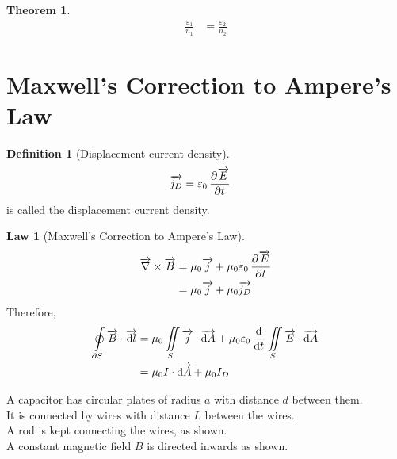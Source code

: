 \documentclass[fleqn, a4paper, 8pt, twoside]{amsart}
\theoremstyle{definition}
\newtheorem{definition}{Definition}
\theoremstyle{theorem}
\newtheorem{theorem}{Theorem}
\newtheorem{law}{Law}
\begin{document}
\begin{multicols}{2}
\begin{spacing}{0.6}
\begin{theorem}
	\begin{align*}
		\frac{\varepsilon_1}{n_1} & = \frac{\varepsilon_2}{n_2}
	\end{align*}
\end{theorem}

\section{Maxwell's Correction to Ampere's Law}

\begin{definition}[Displacement current density]
	\begin{align*}
		\overrightarrow{j_D} & = \varepsilon_0 \dpd{\overrightarrow{E}}{t}
	\end{align*}
	is called the displacement current density.
\end{definition}

\begin{law}[Maxwell's Correction to Ampere's Law]
	\begin{align*}
		\overrightarrow{\nabla} \times \overrightarrow{B} & = \mu_0 \overrightarrow{j} + \mu_0 \varepsilon_0 \dpd{\overrightarrow{E}}{t} \\
                                                                  & = \mu_0 \overrightarrow{j} + \mu_0 \overrightarrow{j_D}
	\end{align*}
	Therefore,
	\begin{align*}
		\oint\limits_{\partial S} \overrightarrow{B} \cdot \overrightarrow{\dif l} & = \mu_0 \iint\limits_{S} \overrightarrow{j} \cdot \overrightarrow{\dif A} + \mu_0 \varepsilon_0 \dod{}{t}\iint\limits_{S} \overrightarrow{E} \cdot \overrightarrow{\dif A} \\
                                                                                           & = \mu_0 I \cdot \overrightarrow{\dif A} + \mu_0 I_D
	\end{align*}
	\label{Maxwell's_Correction_to_Ampere's_Law}
\end{law}

\begin{question}
	A capacitor has circular plates of radius $a$ with distance $d$ between them.\\
	It is connected by wires with distance $L$ between the wires.\\
	A rod is kept connecting the wires, as shown.\\
	A constant magnetic field $B$ is directed inwards as shown.
	\begin{figure}[H]
\end{figure}
\end{question}
\end{spacing}
\end{multicols}
\end{document}
